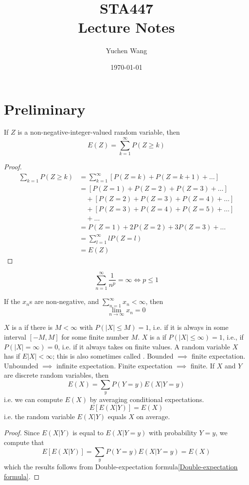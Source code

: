 \documentclass[11pt]{article}
\title{STA447\\ Lecture Notes}
\author{Yuchen Wang}
\date{\today}
\renewcommand{\limit}[1]{\underset{{#1} \rightarrow \infty}{\lim}}
\begin{document}
    \maketitle
    \tableofcontents
    \newpage
    \section{Preliminary}
    \proposition If $Z$ is a non-negative-integer-valued random variable, then
    $$E(Z) = \sum_{k=1}^\infty P(Z \geq k)$$
    \begin{proof}
    \begin{align*}
   	\sum_{k=1}P(Z \geq k) &= \sum_{k=1}^\infty [P(Z= k) + P(Z = k+1) + \hdots] \\
    	&= [P(Z = 1) + P(Z = 2) + P(Z=3) + \hdots]\\
    	 &\quad + [P(Z = 2) + P(Z = 3) + P(Z = 4) + \hdots] \\
    	 &\quad + [P(Z = 3) + P(Z = 4) + P(Z = 5) + \hdots] \\
    	 &\quad + \hdots \\
    	&= P(Z=1) + 2P(Z=2) + 3P(Z=3) + \hdots\\
    	&= \sum_{l=1}^\infty l P(Z=l) \\
    	&= E(Z)
    \end{align*}
    \end{proof}
    
    \fact
    $$\sum_{n=1}^\infty \frac{1}{n^p} = \infty \iff p \leq 1$$
    
    \fact If the $x_n$s are non-negative, and $\sum_{n=1}^\infty x_n < \infty$, then $$\limit{n} x_n = 0$$
    
    $X$ is a  if there is $M < \infty$ with $P(|X| \leq M) = 1$, i.e. if it is always in some interval $[-M, M]$ for some finite number $M$.
    $X$ is a  if $P(|X| \leq \infty) = 1$, i.e., if $P(|X| = \infty) = 0$, i.e. if it  always takes on finite values.
    A random variable $X$ has  if $E|X| < \infty$; this is also sometimes called .
    \fact Bounded $\implies$ finite expectation.
    \fact Unbounded $\implies$ infinite expectation.
    \fact Finite expectation $\implies$ finite.
    If $X$ and $Y$ are discrete random variables, then
    $$E(X) = \sum_{y}P(Y=y)E(X|Y=y)$$
    i.e. we can compute $E(X)$ by averaging conditional expectations.
    $$E[E(X|Y)] = E(X)$$
    i.e. the random variable $E(X|Y)$ equals $X$ on average.
    \begin{proof}
    Since $E(X|Y)$ is equal to $E(X|Y=y)$ with probability $Y=y$, we compute that 
    $$E[E(X|Y)] = \sum_{y}P(Y=y)E(X|Y=y) = E(X)$$
    which the results follows from Double-expectation formula\ref{Double-expectation formula}.
    \end{proof}
    
\end{document}
